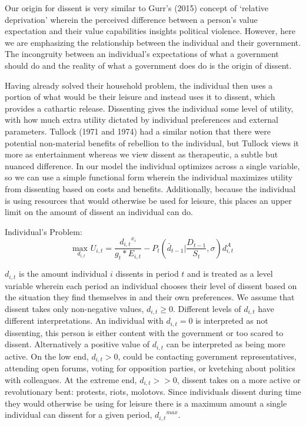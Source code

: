 \documentclass[12pt]{article}
\begin{document}
\begin{spacing}{1.5}
Our origin for dissent is very similar to Gurr's (2015) concept of `relative deprivation' wherein the perceived difference between a person's value expectation and their value capabilities insights political violence. However, here we are emphasizing the relationship between the individual and their government. The incongruity between an individual's expectations of what a government should do and the reality of what a government does do is the origin of dissent.

Having already solved their household problem, the individual then uses a portion of what would be their leisure and instead uses it to dissent, which provides a cathartic release. Dissenting gives the individual some level of utility, with how much extra utility dictated by individual preferences and external parameters. Tullock (1971 and 1974) had a similar notion that there were potential non-material benefits of rebellion to the individual, but Tullock views it more as entertainment whereas we view dissent as therapeutic, a subtle but nuanced difference. In our model the individual optimizes across a single variable, so we can use a simple functional form wherein the individual maximizes utility from dissenting based on costs and benefits. Additionally, because the individual is using resources that would otherwise be used for leisure, this places an upper limit on the amount of dissent an individual can do. 

\vspace{.5 em}
\noindent Individual's Problem:
\begin{equation}
{\underset{d_{i,t}}{\text{max }}}  U_{i,t}= \frac{{d_{i,t}}^{{x}_i}}{g_t * E_{i,t}} - P_t \left( \bar{d}_{t-1} \Bigg|\frac{D_{t-1}}{S_t},\sigma \right)d_{i,t}^A
\end{equation}

$ d_{i,t} $ is the amount individual $i$ dissents in period $t$ and is treated as a level variable wherein each period an individual chooses their level of dissent based on the situation they find themselves in and their own preferences. We assume that dissent takes only non-negative values, $d_{i,t}\geq0$. Different levels of $d_{i,t}$ have different interpretations. An individual with $d_{i,t}=0$ is interpreted as not dissenting, this person is either content with the government or too scared to dissent. Alternatively a positive value of $d_{i,t}$ can be interpreted as being more active. On the low end, $d_{i,t}>0$, could be contacting government representatives, attending open forums, voting for opposition parties, or kvetching about politics with colleagues. At the extreme end, $d_{i,t}>>0$, dissent takes on a more active or revolutionary bent: protests, riots, molotovs. Since individuals dissent during time they would otherwise be using for leisure there is a maximum amount a single individual can dissent for a given period, ${d_{i,t}}^{max}$. 


\end{spacing}
\end{document}
